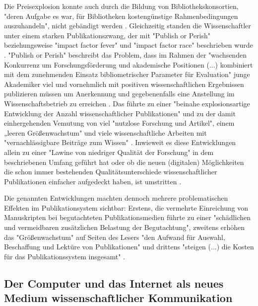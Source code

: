 Die Preisexplosion konnte auch durch die Bildung von Bibliothekskonsortien, "deren Aufgabe es war, für Bibliotheken kostengünstige Rahmenbedingungen auszuhandeln", nicht gebändigt werden \cite{Fladung_2003} \cite{Brintzinger_2010}. Gleichzeitig standen die Wissenschaftler unter einem starken Publikationszwang, der mit "Publish or Perish" \cite{CLAPHAM_2005} beziehungsweise "impact factor fever" \cite{Cherubini_2008} und "impact factor race" \cite{Brischoux_2009} beschrieben wurde \cite{offhaus_2012_institutionelle_repos}. "Publish or Perish" beschreibt das Problem, dass im Rahmen der "wachsenden Konkurrenz um Forschungsförderung und akademische Positionen (...) kombiniert mit dem zunehmenden Einsatz bibliometrischer Parameter für Evaluation" \cite{Fanelli_2010} junge Akademiker viel und vornehmlich mit positiven wissenschaftlichen Ergebnissen publizieren müssen um Anerkennung und gegebenenfalls eine Anstellung im Wissenschaftsbetrieb zu erreichen \cite{pscheida_2010_wikipedia} \cite{Beasley_2005} \cite{hamilton_1990_publishing}. Das führte zu einer "beinahe explosionsartige Entwicklung der Anzahl wissenschaftlicher Publikationen" \cite{bortz_Doering_2006_fragestellung} und zu der damit einhergehenden Vemutung von viel "nutzlose Forschung und Artikel"\cite{smith1990killing}, einem „leeren Größenwachstum" \cite{bbaw_publizieren_2015} und viele wissenschaftliche Arbeiten mit "vernachlässigbare Beiträge zum Wissen" \cite{hamilton_1990_publishing}. Inwieweit es diese Entwicklungen allein zu einer "Lawine von niedriger Qualität der Forschung" \cite{Bauerlein_2010} in dem beschriebenen Umfang geführt hat oder ob die neuen (digitalen) Möglichkeiten die schon immer bestehenden Qualitätsunterschiede wissenschaftlicher Publikationen einfacher aufgedeckt haben, ist umstritten \cite{rekdal_2014_academic}.

Die genannten Entwicklungen machten dennoch mehrere problematischen Effekten im Publikationsystem sichtbar: Erstens, die vermehrte Einreichung von Manuskripten bei begutachteten Publikationsmedien führte zu einer "schädlichen und vermeidbaren zusätzlichen Belastung der Begutachtung", zweitens erhöhen das "Größenwachstum" auf Seiten des Lesers "den Aufwand für Auswahl, Beschaffung und Lektüre von Publikationen" und drittens "steigen (...) die Kosten für das Publikationssystem insgesamt" \cite{bbaw_publizieren_2015}.

\subsection{Der Computer und das Internet als neues Medium wissenschaftlicher Kommunikation}

